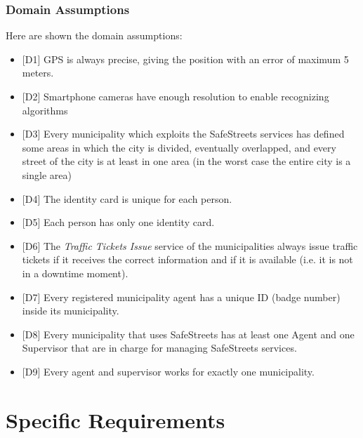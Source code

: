 \documentclass[a4paper]{report}
\begin{document}
\subsection{Domain Assumptions}
\label{subsec:domain-ass} 
Here are shown the domain assumptions:
\begin{itemize}
\item{[D1]} \label{D1} GPS is always precise, giving the position with an error of maximum 5 meters.
\item{[D2]} \label{D2}Smartphone cameras have enough resolution to enable recognizing algorithms
\item{[D3]} \label{D3}Every municipality which exploits the SafeStreets services has defined some areas in which the city is divided, eventually overlapped, and every street of the city is at least in one area (in the worst case the entire city is a single area)
\item{[D4]} \label{D41}The identity card is unique for each person.
\item{[D5]} \label{D5}Each person has only one identity card.
\item{[D6]} \label{D6}The \textit{Traffic Tickets Issue} service of the municipalities always issue traffic tickets if it receives the correct information and if it is available (i.e. it is not in a downtime moment).
\item{[D7]} \label{D7}Every registered municipality agent has a unique ID (badge number) inside its municipality.
\item{[D8]} \label{D8}Every municipality that uses SafeStreets has at least one Agent and one Supervisor that are in charge for managing SafeStreets services.
\item{[D9]} \label{D9}Every agent and supervisor works for exactly one municipality.
\end{itemize}

\chapter{Specific Requirements}
\end{document}
